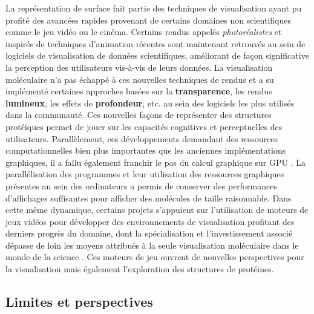 La représentation de surface fait partie des techniques de visualisation ayant pu profité des avancées rapides provenant de certains domaines non scientifiques comme le jeu vidéo ou le cinéma. Certains rendus appelés \textit{photoréalistes} et inspirés de techniques d'animation récentes sont maintenant retrouvés au sein de logiciels de visualisation de données scientifiques, améliorant de façon significative la perception des utilisateurs vis-à-vis de leurs données. La visualisation moléculaire n'a pas échappé à ces nouvelles techniques de rendus et a su implémenté certaines approches basées sur la \textbf{transparence}, les rendus \textbf{lumineux}, les effets de \textbf{profondeur}, etc. au sein des logiciels les plus utilisés dans la communauté. Ces nouvelles façons de représenter des structures protéiques permet de jouer sur les capacités cognitives et perceptuelles des utilisateurs. Parallèlement, ces développements demandant des ressources computationnelles bien plus importantes que les anciennes implémentations graphiques, il a fallu également franchir le pas du calcul graphique sur GPU \cite{chavent_gpu-powered_2011}. La parallélisation des programmes et leur utilisation des ressources graphiques présentes au sein des ordinateurs a permis de conserver des performances d'affichages suffisantes pour afficher des molécules de taille raisonnable. Dans cette même dynamique, certains projets s'appuient sur l'utilisation de moteurs de jeux vidéos pour développer des environnements de visualisation profitant des derniers progrès du domaine, dont la spécialisation et l'investissement associé dépasse de loin les moyens attribués à la seule visualisation moléculaire dans le monde de la science \cite{andrei2012intuitive,lv_game_2013}. Ces moteurs de jeu ouvrent de nouvelles perspectives pour la visualisation mais également l'exploration des structures de protéines.

\subsection{Limites et perspectives}

